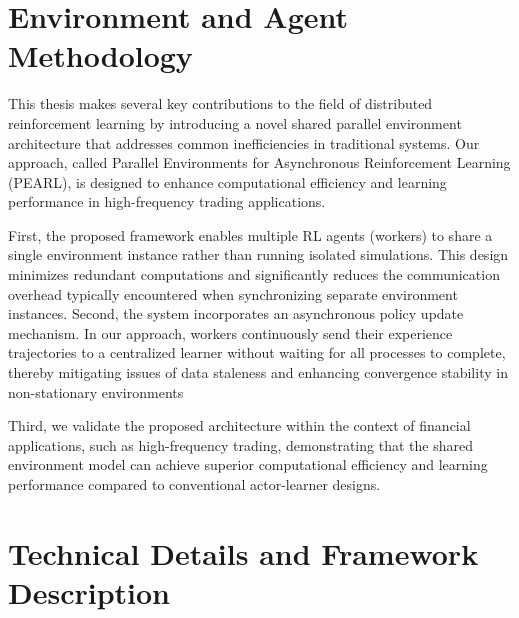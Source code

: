 

\section{Environment and Agent Methodology}
\label{sec:methodology}

This thesis makes several key contributions to the field of distributed reinforcement learning by introducing a novel shared
parallel environment architecture that addresses common inefficiencies in traditional systems.
Our approach, called Parallel Environments for Asynchronous Reinforcement Learning (PEARL),
is designed to enhance computational efficiency and learning performance in high-frequency trading applications.

First, the proposed framework enables multiple RL agents (workers) to share a single environment instance rather than running isolated simulations.
This design minimizes redundant computations and significantly reduces the communication overhead typically
encountered when synchronizing separate environment instances.
Second, the system incorporates an asynchronous policy update mechanism.
In our approach, workers continuously send their experience trajectories to a centralized learner without waiting for all processes to complete,
thereby mitigating issues of data staleness and enhancing convergence stability in non-stationary environments

Third, we validate the proposed architecture within the context of financial applications,
such as high-frequency trading, demonstrating that the shared environment
model can achieve superior computational efficiency and learning performance compared to conventional actor-learner designs.




\section{Technical Details and Framework Description}
\label{sec:technical_details}




